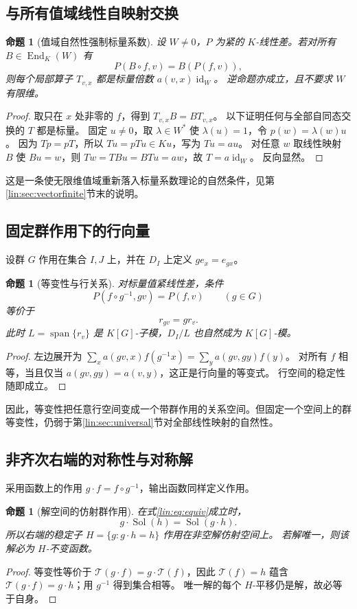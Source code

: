 \documentclass[11pt,a4paper,oneside,openany]{book}
\theoremstyle{lecture}
\newtheorem{proposition}[theorem]{命题}
\newcommand{\End}{\operatorname{End}}
\newcommand{\Span}{\operatorname{span}}
\newcommand{\id}{\operatorname{id}}
\newcommand{\T}{\mathcal T}
\newcommand{\Sol}{\operatorname{Sol}}
\numberwithin{equation}{section}
\begin{document}
\subsection{与所有值域线性自映射交换}
\begin{proposition}[值域自然性强制标量系数]\label{lin:prop:commutant}
设 $W\ne0$，$P$ 为紧的 $K$-线性差。若对所有 $B\in\End_K(W)$ 有
\[
 P(B\circ f,v)=B(P(f,v)),
\]
则每个局部算子 $T_{v,x}$ 都是标量倍数 $a(v,x)\id_W$。
逆命题亦成立，且不要求 $W$ 有限维。
\end{proposition}
\begin{proof}
取只在 $x$ 处非零的 $f$，得到 $T_{v,x}B=BT_{v,x}$。
以下证明任何与全部自同态交换的 $T$ 都是标量。
固定 $u\ne0$，取 $\lambda\in W^*$ 使 $\lambda(u)=1$，令 $p(w)=\lambda(w)u$。
因为 $Tp=pT$，所以 $Tu=pTu\in Ku$，写为 $Tu=au$。
对任意 $w$ 取线性映射 $B$ 使 $Bu=w$，则 $Tw=TBu=BTu=aw$，故 $T=a\id_W$。
反向显然。
\end{proof}
这是一条使无限维值域重新落入标量系数理论的自然条件，见第\ref{lin:sec:vectorfinite}节末的说明。

\subsection{固定群作用下的行向量}
设群 $G$ 作用在集合 $I,J$ 上，并在 $D_I$ 上定义 $g e_x=e_{gx}$。
\begin{proposition}[等变性与行关系]
对标量值紧线性差，条件
\begin{equation}\label{lin:eq:equiv}
 P(f\circ g^{-1},gv)=P(f,v)\qquad(g\in G)
\end{equation}
等价于
\[
 r_{gv}=g r_v.
\]
此时 $L=\Span\{r_v\}$ 是 $K[G]$-子模，$D_I/L$ 也自然成为 $K[G]$-模。
\end{proposition}
\begin{proof}
左边展开为 $\sum_xa(gv,x)f(g^{-1}x)=\sum_ya(gv,gy)f(y)$。
对所有 $f$ 相等，当且仅当 $a(gv,gy)=a(v,y)$，这正是行向量的等变式。
行空间的稳定性随即成立。
\end{proof}
因此，等变性把任意行空间变成一个带群作用的关系空间。但固定一个空间上的群等变性，仍弱于第\ref{lin:sec:universal}节对全部线性映射的自然性。

\subsection{非齐次右端的对称性与对称解}
采用函数上的作用 $g\cdot f=f\circ g^{-1}$，输出函数同样定义作用。
\begin{proposition}[解空间的仿射群作用]\label{lin:prop:affinesolutions}
在式\eqref{lin:eq:equiv}成立时，
\[
 g\cdot\Sol(h)=\Sol(g\cdot h).
\]
所以右端的稳定子 $H=\{g:g\cdot h=h\}$ 作用在非空解仿射空间上。
若解唯一，则该解必为 $H$-不变函数。
\end{proposition}
\begin{proof}
等变性等价于 $\T(g\cdot f)=g\cdot\T(f)$，因此 $\T(f)=h$ 蕴含 $\T(g\cdot f)=g\cdot h$；用 $g^{-1}$ 得到集合相等。
唯一解的每个 $H$-平移仍是解，故必等于自身。
\end{proof}
\end{document}
